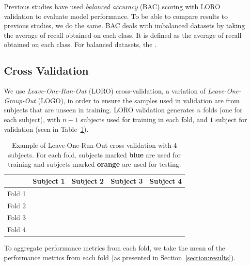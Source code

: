         Previous studies have used \emph{balanced accuracy} (BAC) scoring with LORO validation to evaluate model performance. To be able to compare results to previous studies, we do the same. BAC deals with imbalanced datasets by taking the average of recall obtained on each class. It is defined as the average of recall obtained on each class. For balanced datasets, the .

    \subsection{Cross Validation}

        We use \emph{Leave-One-Run-Out} (LORO) cross-validation, a variation of \emph{Leave-One-Group-Out} (LOGO), in order to ensure the samples used in validation are from subjects that are unseen in training. LORO validation generates $n$ folds (one for each subject), with $n-1$ subjects used for training in each fold, and $1$ subject for validation (seen in Table~\ref{table:loro}).

        \begin{table}[h]
            \centering
            \begin{tabular}{lcccc}
                \toprule
                       & Subject 1 & Subject 2 & Subject 3 & Subject 4 \\
                \midrule
                Fold 1 & \cellcolor{test}     & \multicolumn{3}{c}{\cellcolor{train}} \\
                Fold 2 & \cellcolor{train} & \cellcolor{test}     & \multicolumn{2}{c}{\cellcolor{train}     } \\
                Fold 3 & \multicolumn{2}{c}{\cellcolor{train}     } & \cellcolor{test}     & \cellcolor{train} \\
                Fold 4 & \multicolumn{3}{c}{\cellcolor{train}} & \cellcolor{test}     \\
                \bottomrule
            \end{tabular}
            \caption{Example of Leave-One-Run-Out cross validation with 4 subjects. For each fold, subjects marked \textcolor{NavyBlue}{\textbf{blue}} are used for training and subjects marked \textcolor{BurntOrange}{\textbf{orange}} are used for testing.}\label{table:loro}
        \end{table}

        To aggregate performance metrics from each fold, we take the mean of the performance metrics from each fold (as presented in Section~\ref{section:results}).

